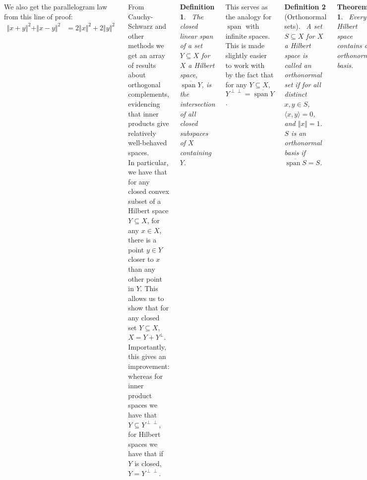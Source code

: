 \documentclass{tikzposter} %
\DeclareMathOperator{\Span}{span}
\newtheorem{theorem}{Theorem}
\newtheorem{definition}{Definition}
\begin{document}
\begin{columns}
{    We also get the parallelogram law from this line of proof:
    \begin{align*}
      \Vert x+y\Vert ^{2} + \Vert x - y\Vert ^{2} &= 2\Vert x\Vert ^{2} + 2\Vert y\Vert ^{2}
    \end{align*}

    From Cauchy-Schwarz and other methods we get an array of results about orthogonal complements, evidencing that inner products give relatively well-behaved spaces. \\

    In particular, we have that for any closed convex subset of a Hilbert space $Y \subseteq X$, for any $x \in X$, there is a point $y \in Y$ closer to $x$ than any other point in $Y$. This allows us to show that for any closed set $Y \subseteq X$, $X = Y + Y^{\perp}$. \\

    Importantly, this gives an improvement: whereas for inner product spaces we have that $Y \subseteq Y^{\perp \perp}$, for Hilbert spaces we have that if $Y$ is closed, $Y = Y^{\perp \perp}$. \\

    \begin{definition}
    \ The closed linear span of a set $Y \subseteq X$ for $X$ a Hilbert space, $\overline{\Span Y}$, is the intersection of all closed subspaces of $X$ containing $Y$.
    \end{definition}
    \hphantom{}

    This serves as the analogy for $\Span$ with infinite spaces. This is made slightly easier to work with by the fact that for any $Y \subseteq X$, $Y^{\perp \perp} = \overline{\Span Y}$. \\

    \begin{definition}[Orthonormal sets]
      \ A set $S \subseteq X$ for $X$ a Hilbert space is called an orthonormal set if for all distinct $x, y \in S$, $\langle x, y \rangle = 0$, and $\Vert x\Vert  = 1$. $S$ is an orthonormal basis if $\overline{\Span S} = S$.
    \end{definition}
    \hphantom{}

    \begin{theorem}
    \ Every Hilbert space contains an orthonormal basis.
    \end{theorem}
    \hphantom{}

    The proof of this is complex and beyond the scope of the course for non-separable Hilbert spaces. Assuming a Hilbert space \emph{is} separable, there is a countable dense subset $S \subseteq X$. We then apply the Gram-Schmidt process to obtain an orthonormal set satisfying our requirements. \\

}
\end{columns}
\end{document}
